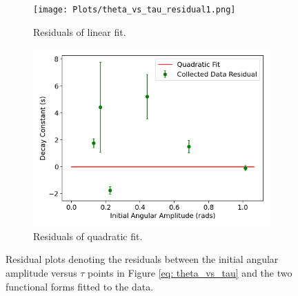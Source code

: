 \begin{figure}[H]
\centering
\begin{subfigure}[t]{0.5\textwidth}
  \centering
  \texttt{[image: Plots/theta\_vs\_tau\_residual1.png]}
  \caption{\small{Residuals of linear fit.}}
  \label{theta_tau_residual1}
\end{subfigure}%
\begin{subfigure}[t]{.5\textwidth}
  \centering
  \includegraphics[width=\textwidth]{Plots/theta_vs_tau_residual2.png}
  \caption{\small{Residuals of quadratic fit.}}
  \label{theta_tau_residual2}
\end{subfigure}
\caption{\small{Residual plots denoting the residuals between the initial angular amplitude versus $\tau$ points in Figure \ref{eq: theta_vs_tau} and the two functional forms fitted to the data.}}
\end{figure}










